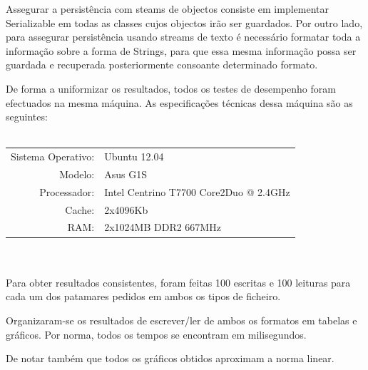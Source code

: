 \documentclass[a5paper,twocolumn, 11pt]{article}
\begin{document}
Assegurar a persistência com steams de objectos consiste em implementar Serializable em todas as classes cujos objectos irão ser guardados. Por outro lado, para assegurar persistência usando streams de texto é necessário formatar toda a informação sobre a forma de Strings, para que essa mesma informação possa ser guardada e recuperada posteriormente consoante determinado formato.

De forma a uniformizar os resultados, todos os testes de desempenho foram efectuados na mesma máquina. As especificações técnicas dessa máquina são as seguintes:\\
\\
\begin{tabular}{ | r  | p{2.8cm} | }
    \hline
    Sistema Operativo: & Ubuntu 12.04 \\
    Modelo: & Asus G1S \\
    Processador: & \vbox{Intel Centrino} T7700 \vbox{Core2Duo} @ 2.4GHz \\
    Cache: & \vbox{2x4096Kb}\\
    RAM: & 2x1024MB DDR2 667MHz\\ \hline
\end{tabular}\\
\\

Para obter resultados consistentes, foram feitas 100 escritas e 100 leituras para cada um dos patamares pedidos em ambos os tipos de ficheiro.

Organizaram-se os resultados de escrever/ler de ambos os formatos em tabelas e gráficos. Por norma, todos os tempos se encontram em milisegundos.

De notar também que todos os gráficos obtidos aproximam a norma linear.

\clearpage
\end{document}
